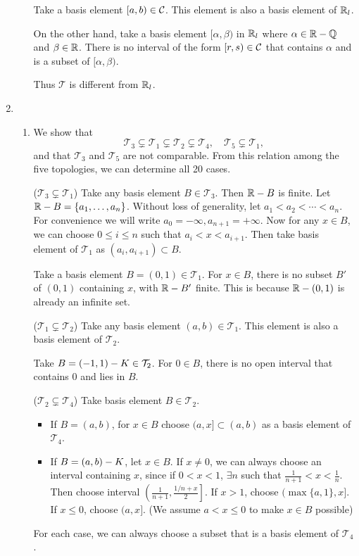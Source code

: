 \documentclass[12pt]{report}
\newcommand{\prob}[1]{\item[\large\textbf{\sffamily #1.}]}
\newcommand{\subprob}[1]{\item[\textbf{\sffamily (#1)}]}
\newcommand{\T}{\mathcal{T}}
\begin{document}
\begin{enumerate}
\begin{enumerate}
        Take a basis element \([a, b) \in \mathcal{C}\). This element is also a basis element of \(\mathbb{R}_l\).

        On the other hand, take a basis element \([\alpha, \beta)\) in \(\mathbb{R}_l\) where \(\alpha \in \mathbb{R} - \mathbb{Q}\) and \(\beta \in \mathbb{R}\). There is no interval of the form \([r, s) \in \mathcal{C}\) that contains \(\alpha\) and is a subset of \([\alpha, \beta)\).

        Thus \(\T\) is different from \(\mathbb{R}_l\).
    \end{enumerate}

    \prob{2}
    \begin{enumerate}
        \subprob{a} We show that
        \[
            \T_3 \subsetneq \T_1 \subsetneq \T_2 \subsetneq \T_4, \quad \T_5 \subsetneq \T_1,
        \]
        and that \(\T_3\) and \(\T_5\) are not comparable. From this relation among the five topologies, we can determine all 20 cases.

        \medskip

        (\(\T_3 \subsetneq \T_1\)) Take any basis element \(B \in \T_3\). Then \(\mathbb{R} - B\) is finite. Let \(\mathbb{R} - B = \{a_1, \dots, a_n\}\). Without loss of generality, let \(a_1 < a_2 < \cdots < a_n\). For convenience we will write \(a_0 = -\infty, a_{n+1} = +\infty\). Now for any \(x \in B\), we can choose \(0 \leq i \leq n\) such that \(a_i < x < a_{i+1}\). Then take basis element of \(\T_1\) as \((a_i, a_{i+1}) \subset B\).

        Take a basis element \(B = (0, 1) \in \T_1\). For \(x \in B\), there is no subset \(B'\) of \((0, 1)\) containing \(x\), with \(\mathbb{R} - B'\) finite. This is because \(\mathbb{R} - (0, 1)\) is already an infinite set.

        \medskip

        (\(\T_1 \subsetneq \T_2\)) Take any basis element \((a, b) \in \T_1\). This element is also a basis element of \(\T_2\).        \smallskip

        Take \(B = (-1, 1) \bs K \in \T_2\). For \(0 \in B\), there is no open interval that contains \(0\) and lies in \(B\).

        \medskip

        (\(\T_2 \subsetneq \T_4\)) Take basis element \(B \in \T_2\).
        \begin{itemize}
            \item If \(B = (a, b)\), for \(x \in B\) choose \((a, x] \subset (a, b)\) as a basis element of \(\T_4\).
            \item If \(B = (a, b) - K\), let \(x \in B\). If \(x \neq 0\), we can always choose an interval containing \(x\), since if \(0 < x < 1\), \(\exists n\) such that \(\frac{1}{n+1} < x < \frac{1}{n}\). Then choose interval \(\left(\frac{1}{n+1}, \frac{1/n + x}{2}\right]\). If \(x > 1\), choose \((\max\{a, 1\}, x]\). If \(x \leq 0\), choose \((a, x]\). (We assume \(a < x \leq 0\) to make \(x \in B\) possible)
        \end{itemize}
        For each case, we can always choose a subset that is a basis element of \(\T_4\).


\end{enumerate}
\end{enumerate}
\end{document}

